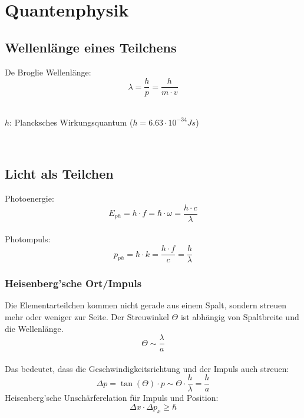 



\chapter{Quantenphysik}

\section{Wellenlänge eines Teilchens}
De Broglie Wellenlänge:
\[\boxed{
	\lambda = \frac{h}{p} = \frac{h}{m \cdot v}
}\]
\\
\begin{footnotesize}
	$h$: Plancksches Wirkungsquantum ($h = 6.63 \cdot 10^{-34}Js$)
\end{footnotesize}
\\

\section{Licht als Teilchen}
Photoenergie:
\[\boxed{
	E_{ph} = h \cdot f = \hbar \cdot \omega = \frac{h \cdot c}{\lambda}
}\]
\\
Photompuls:
\[\boxed{
	p_{ph} = \hbar \cdot k = \frac{h \cdot f}{c} = \frac{h}{\lambda}
}\]

\subsection{Heisenberg'sche Ort/Impuls}
Die Elementarteilchen kommen nicht gerade aus einem Spalt, sondern streuen mehr oder weniger zur Seite. Der Streuwinkel $\Theta$ ist abhängig von Spaltbreite und die Wellenlänge.\\
\[
	\Theta \sim \frac{\lambda}{a}
\]
\\
Das bedeutet, dass die Geschwindigkeitsrichtung und der Impuls auch streuen:
\[
	\Delta p = \tan(\Theta)\cdot p\sim \Theta \cdot \frac{h}{\lambda}=\frac{h}{a}
\]
Heisenberg'sche Unschärferelation für Impuls und Position:
\[
	\Delta x \cdot \Delta p_x \geq \hbar
\]
